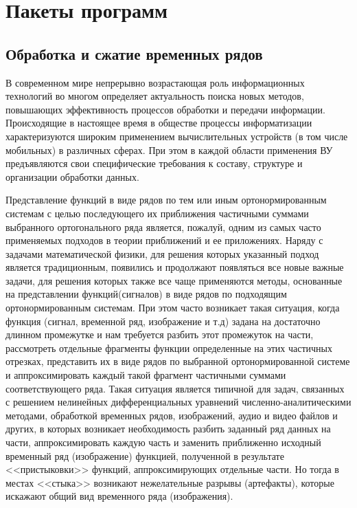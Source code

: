 \section{Пакеты программ}
\subsection{Обработка и сжатие временных рядов}



В современном мире непрерывно возрастающая роль информационных технологий во многом определяет актуальность поиска новых методов, повышающих эффективность процессов обработки и передачи информации. Происходящие в настоящее время в обществе процессы информатизации характеризуются широким применением вычислительных устройств (в том числе мобильных) в различных сферах. При этом в каждой области применения ВУ предъявляются свои специфические требования к составу, структуре и организации обработки данных. %


Представление функций в виде рядов по тем или иным ортонормированным системам с целью последующего их приближения частичными суммами выбранного ортогонального ряда является, пожалуй, одним из самых часто применяемых подходов в теории приближений и ее приложениях. Наряду с задачами математической физики, для решения которых указанный подход является традиционным, появились и продолжают появляться все новые важные задачи, для решения которых также все чаще применяются методы, основанные на представлении функций(сигналов) в виде рядов по подходящим ортонормированным системам. При этом часто возникает такая ситуация, когда функция (сигнал, временной ряд, изображение и т.д) задана на достаточно длинном промежутке и нам требуется разбить этот промежуток на части, рассмотреть отдельные фрагменты функции определенные на этих частичных отрезках, представить их в виде рядов по выбранной ортонормированной системе и аппроксимировать каждый такой фрагмент частичными суммами соответствующего ряда. Такая ситуация является типичной для задач, связанных с решением нелинейных дифференциальных уравнений численно-аналитическими методами, обработкой временных рядов, изображений, аудио и видео файлов и других, в которых возникает необходимость разбить заданный ряд данных на части, аппроксимировать каждую часть и заменить приближенно исходный временный ряд (изображение) функцией, полученной в результате <<пристыковки>> функций, аппроксимирующих отдельные части. Но тогда в местах <<стыка>> возникают нежелательные разрывы (артефакты), которые искажают общий вид временного ряда (изображения).

